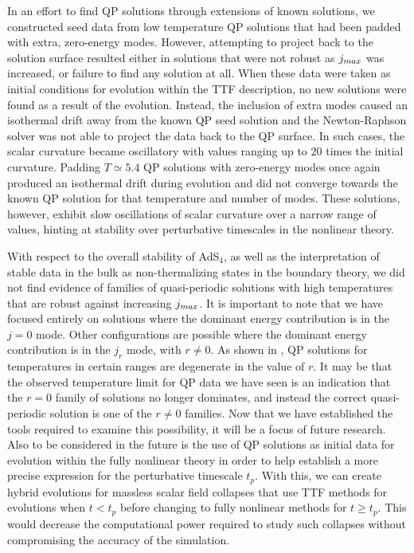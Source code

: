 \documentclass[../PhD.tex]{subfiles}
\begin{document}
In an effort to find QP solutions through extensions of known solutions, we constructed seed data from low temperature QP solutions that had been padded with extra, zero-energy modes. However, attempting to project back to the solution surface resulted either in solutions that were not robust as $j_{max}$ was increased, or failure to find any solution at all. When these data were taken as initial conditions for evolution within the TTF description, no new solutions were found as a result of the evolution. Instead, the inclusion of extra modes caused an isothermal drift away from the known QP seed solution and the Newton-Raphson solver was not able to project the data back to the QP surface. In such cases, the scalar curvature became oscillatory with values ranging up to $20$ times the initial curvature. Padding $T \simeq 5.4$ QP solutions with zero-energy modes once again produced an isothermal drift during evolution and did not converge towards the known QP solution for that temperature and number of modes. These solutions, however, exhibit slow oscillations of scalar curvature over a narrow range of values, hinting at stability over perturbative timescales in the nonlinear theory. 

With respect to the overall stability of AdS$_4$, as well as the interpretation of stable data in the bulk as non-thermalizing states in the boundary theory, we did not find evidence of families of quasi-periodic solutions with high temperatures that are robust against increasing $j_{max}$. It is important to note that we have focused entirely on solutions where the dominant energy contribution is in the $j = 0$ mode. Other configurations are possible where the dominant energy contribution is in the $j_r$ mode, with $r \neq 0$. As shown in \cite{1507.08261}, QP solutions for temperatures in certain ranges are degenerate in the value of $r$. It may be that the observed temperature limit for QP data we have seen is an indication that the $r=0$ family of solutions no longer dominates, and instead the correct quasi-periodic solution is one of the $r \neq 0$ families. Now that we have established the tools required to examine this possibility, it will be a focus of future research. Also to be considered in the future is the use of QP solutions as initial data for evolution within the fully nonlinear theory in order to help establish a more precise expression for the perturbative timescale $t_p$. With this, we can create hybrid evolutions for massless scalar field collapses that use TTF methods for evolutions when $t < t_p$ before changing to fully nonlinear methods for $t \geq t_p$. This would decrease the computational power required to study such collapses without compromising the accuracy of the simulation.
\end{document}
